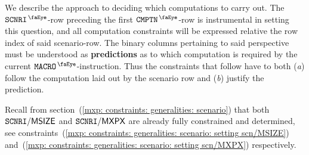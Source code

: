 We describe the approach to deciding which computations to carry out.
The $\isMxpScenario$-row preceding the first $\isMxpComputation$-row is instrumental in setting this question,
and all computation constraints will be expressed relative the row index of said scenario-row.
The binary columns pertaining to said perspective must be understood as \textbf{predictions} as to which computation is required by the current $\isMxpMacro$-instruction.
Thus the constraints that follow have to both
(\emph{a}) follow the computation laid out by the scenario row and
(\emph{b}) justify the prediction.

Recall from
section~(\ref{mxp: constraints: generalities: scenario})
that both $\texttt{SCNRI}\textsf{/}{\textsf{MSIZE}}$ and $\texttt{SCNRI}\textsf{/}{\textsf{MXPX}}$ are already fully constrained and determined,
see constraints~(\ref{mxp: constraints: generalities: scenario: setting scn/MSIZE})
and~(\ref{mxp: constraints: generalities: scenario: setting scn/MXPX})
respectively.

 \label{mxp: computations: decision tree}
